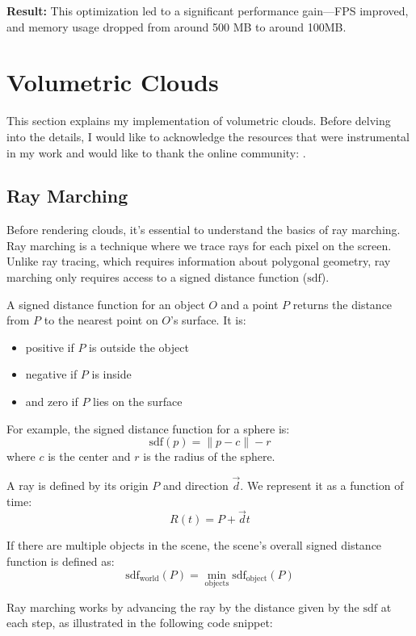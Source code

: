 \textbf{Result:} This optimization led to a significant performance gain—FPS improved, and memory usage dropped from around 500 MB to around 100MB.


\section{Volumetric Clouds}
This section explains my implementation of volumetric clouds. Before delving into the details, I would like to acknowledge the resources that were instrumental in my work and would like to thank the online community: \cite{sebestianlague2019} \cite{shadertoy2013} \cite{guerrillagames2025nubis} \cite{reinder2018} \cite{fredrik} \cite{gamedevnet2015horizonzerodawn} \cite{palenik2016volumetricclouds} \cite{maxime2023} \cite{engel2016gpupro7}.
\subsection{Ray Marching}

Before rendering clouds, it's essential to understand the basics of ray marching. Ray marching is a technique where we trace rays for each pixel on the screen. Unlike ray tracing, which requires information about polygonal geometry, ray marching only requires access to a signed distance function ($\text{sdf}$). 

A signed distance function for an object $O$ and a point $P$ returns the distance from $P$ to the nearest point on $O$'s surface. It is:
\begin{itemize}
\item{positive if $P$ is outside the object}
\item{negative if $P$ is inside}
\item{and zero if $P$ lies on the surface}
\end{itemize}

For example, the signed distance function for a sphere is:
\[
\text{sdf}(p) = \|p - c\| - r
\]
where $c$ is the center and $r$ is the radius of the sphere.

A ray is defined by its origin $P$ and direction $\vec{d}$. We represent it as a function of time:
\[
R(t) = P + \vec{d}t
\]

If there are multiple objects in the scene, the scene’s overall signed distance function is defined as:
\[
\text{sdf}_{\text{world}}(P) = \min_{\text{objects}} \text{sdf}_{\text{object}}(P)
\]

Ray marching works by advancing the ray by the distance given by the $\text{sdf}$ at each step, as illustrated in the following code snippet:

